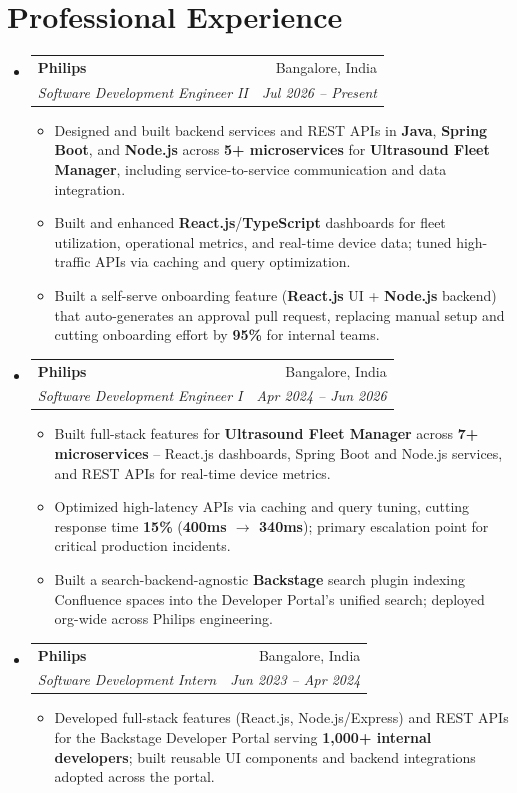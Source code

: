 \documentclass[letterpaper,10.5pt]{article}
\makeatletter
\newcommand{\resumeItem}[1]{
  \item\small{#1\vspace{-3pt}}
}
\newcommand{\resumeSubheading}[4]{
  \vspace{-2pt}\item
    \begin{tabular*}{0.97\textwidth}[t]{l@{\extracolsep{\fill}}r}
      \textbf{#1} & \small #2 \\
      \textit{\small#3} & \textit{\small #4} \\
    \end{tabular*}\vspace{-4pt}
}
\newcommand{\resumeSubHeadingListStart}{\begin{itemize}[leftmargin=0.15in, label={}]}
\newcommand{\resumeSubHeadingListEnd}{\end{itemize}}
\newcommand{\resumeItemListStart}{\begin{itemize}[leftmargin=0.2in]\vspace{-2pt}}
\newcommand{\resumeItemListEnd}{\end{itemize}\vspace{-3pt}}
\makeatother
\begin{document}
\section{Professional Experience}
\resumeSubHeadingListStart

  \resumeSubheading
    {Philips}{Bangalore, India}
    {Software Development Engineer II}{Jul 2026 -- Present}
    \resumeItemListStart
      \resumeItem{Designed and built backend services and REST APIs in \textbf{Java}, \textbf{Spring Boot}, and \textbf{Node.js} across \textbf{5+ microservices} for \textbf{Ultrasound Fleet Manager}, including service-to-service communication and data integration.}
      \resumeItem{Built and enhanced \textbf{React.js}/\textbf{TypeScript} dashboards for fleet utilization, operational metrics, and real-time device data; tuned high-traffic APIs via caching and query optimization.}
      \resumeItem{Built a self-serve onboarding feature (\textbf{React.js} UI + \textbf{Node.js} backend) that auto-generates an approval pull request, replacing manual setup and cutting onboarding effort by \textbf{95\%} for internal teams.}
    \resumeItemListEnd

  \resumeSubheading
    {Philips}{Bangalore, India}
    {Software Development Engineer I}{Apr 2024 -- Jun 2026}
    \resumeItemListStart
      \resumeItem{Built full-stack features for \textbf{Ultrasound Fleet Manager} across \textbf{7+ microservices} -- React.js dashboards, Spring Boot and Node.js services, and REST APIs for real-time device metrics.}
      \resumeItem{Optimized high-latency APIs via caching and query tuning, cutting response time \textbf{15\%} (\textbf{400ms $\rightarrow$ 340ms}); primary escalation point for critical production incidents.}
      \resumeItem{Built a search-backend-agnostic \textbf{Backstage} search plugin indexing Confluence spaces into the Developer Portal's unified search; deployed org-wide across Philips engineering.}
    \resumeItemListEnd

  \resumeSubheading
    {Philips}{Bangalore, India}
    {Software Development Intern}{Jun 2023 -- Apr 2024}
    \resumeItemListStart
      \resumeItem{Developed full-stack features (React.js, Node.js/Express) and REST APIs for the Backstage Developer Portal serving \textbf{1,000+ internal developers}; built reusable UI components and backend integrations adopted across the portal.}
    \resumeItemListEnd

\resumeSubHeadingListEnd

\end{document}
